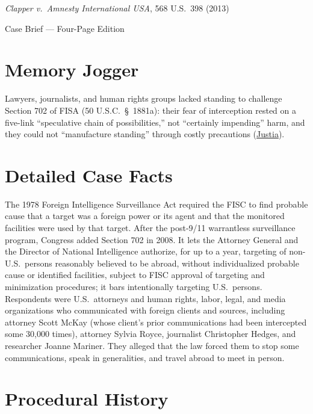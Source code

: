 \documentclass[12pt]{article}
\begin{document}
\begin{center}
{\LARGE \textit{Clapper v.\ Amnesty International USA}, 568 U.S.\ 398 (2013)\par}
\vspace{0.8em}
{\large Case Brief --- Four-Page Edition\par}
\end{center}
\vspace{1em}

\section{Memory Jogger}

Lawyers, journalists, and human rights groups lacked standing to challenge Section 702 of FISA (50 U.S.C.\ \S~1881a): their fear of interception rested on a five-link ``speculative chain of possibilities,'' not ``certainly impending'' harm, and they could not ``manufacture standing'' through costly precautions (\href{https://supreme.justia.com/cases/federal/us/568/398/}{Justia}).

\section{Detailed Case Facts}

The 1978 Foreign Intelligence Surveillance Act required the FISC to find probable cause that a target was a foreign power or its agent and that the monitored facilities were used by that target. After the post-9/11 warrantless surveillance program, Congress added Section 702 in 2008. It lets the Attorney General and the Director of National Intelligence authorize, for up to a year, targeting of non-U.S.\ persons reasonably believed to be abroad, without individualized probable cause or identified facilities, subject to FISC approval of targeting and minimization procedures; it bars intentionally targeting U.S.\ persons. Respondents were U.S.\ attorneys and human rights, labor, legal, and media organizations who communicated with foreign clients and sources, including attorney Scott McKay (whose client's prior communications had been intercepted some 30,000 times), attorney Sylvia Royce, journalist Christopher Hedges, and researcher Joanne Mariner. They alleged that the law forced them to stop some communications, speak in generalities, and travel abroad to meet in person.

\section{Procedural History}
\end{document}
